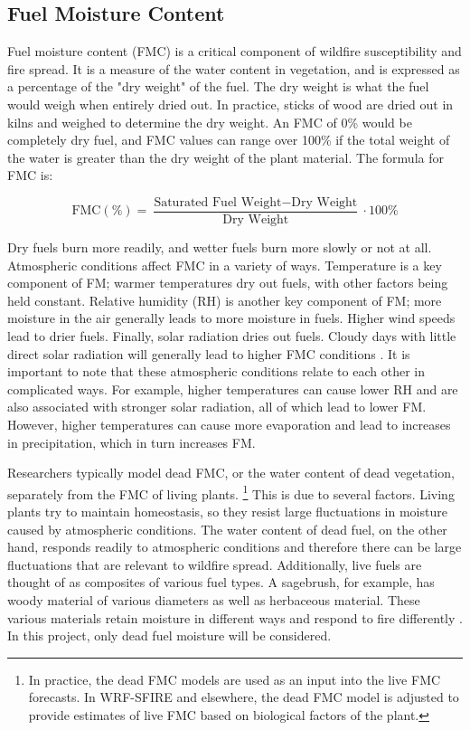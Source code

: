 \documentclass[11pt]{article}%
\begin{document}
\subsection{Fuel Moisture Content}

Fuel moisture content (FMC) is a critical component of wildfire susceptibility and fire spread. It is a measure of the water content in vegetation, and is expressed as a percentage of the "dry weight" of the fuel. \cite{NCEI-2024-DFM} The dry weight is what the fuel would weigh when entirely dried out. In practice, sticks of wood are dried out in kilns and weighed to determine the dry weight. An FMC of 0\% would be completely dry fuel, and FMC values can range over 100\% if the total weight of the water is greater than the dry weight of the plant material. The formula for FMC is:

\begin{equation}
    \text{FMC} (\%) = \frac{\text{Saturated Fuel Weight} - \text{Dry Weight}}{\text{Dry Weight}} \cdot 100\%
\end{equation}

Dry fuels burn more readily, and wetter fuels burn more slowly or not at all. Atmospheric conditions affect FMC in a variety of ways. Temperature is a key component of FM; warmer temperatures dry out fuels, with other factors being held constant. Relative humidity (RH) is another key component of FM; more moisture in the air generally leads to more moisture in fuels. Higher wind speeds lead to drier fuels. Finally, solar radiation dries out fuels. Cloudy days with little direct solar radiation will generally lead to higher FMC conditions \cite{NWCG-FireWeather}. It is important to note that these atmospheric conditions relate to each other in complicated ways. For example, higher temperatures can cause lower RH and are also associated with stronger solar radiation, all of which lead to lower FM. However, higher temperatures can cause more evaporation and lead to increases in precipitation, which in turn increases FM. 

Researchers typically model dead FMC, or the water content of dead vegetation, separately from the FMC of living plants. \footnote{In practice, the dead FMC models are used as an input into the live FMC forecasts. In WRF-SFIRE and elsewhere, the dead FMC model is adjusted to provide estimates of live FMC based on biological factors of the plant.} This is due to several factors. Living plants try to maintain homeostasis, so they resist large fluctuations in moisture caused by atmospheric conditions. The water content of dead fuel, on the other hand, responds readily to atmospheric conditions and therefore there can be large fluctuations that are relevant to wildfire spread. Additionally, live fuels are thought of as composites of various fuel types. A sagebrush, for example, has woody material of various diameters as well as herbaceous material. These various materials retain moisture in different ways and respond to fire differently \cite{NWCG-FireWeather}. In this project, only dead fuel moisture will be considered. 
\end{document}
